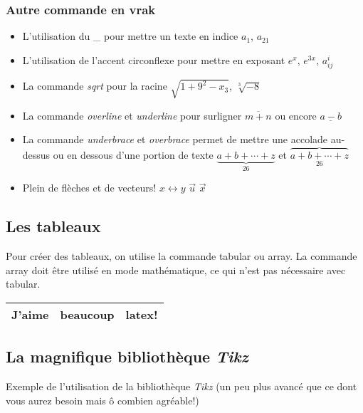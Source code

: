 \documentclass[12pt,twoside,a4paper]{article}
\begin{document}
	
	
	
	
	
	
	\subsubsection{Autre commande en vrak}
	\begin{itemize}
		\item L'utilisation du \_ pour mettre un texte en indice $a_1$, $a_{21}$
		\item L'utilisation de l'accent circonflexe pour mettre en exposant $e^x$, $e^{3x}$, $a^{i}_{ij}$
		\item La commande \textit{sqrt} pour la racine  $\sqrt{1+9^2-x_3}$, $\sqrt[3]{-8}$
		\item La commande \textit{overline} et \textit{underline} pour surligner  $\overline{m+n}$ ou encore $\underline{a-b}$
		\item La commande \textit{underbrace} et \textit{overbrace} permet de mettre une accolade au-dessus ou en dessous d'une portion de texte $\underbrace{ a+b+\cdots+z }_{26}$ et $\overbrace{ a+b+\cdots+z }_{26}$
		\item Plein de flèches et de vecteurs! $x\leftrightarrow y$ $\vec{u}$ $\vec{x}$
		
	\end{itemize}
	
	
	\subsection{Les tableaux}
	
	Pour créer des tableaux, on utilise la commande tabular ou array. La commande array doit être utilisé en mode mathématique, ce qui n'est pas nécessaire avec tabular. 
	
	\begin{center}
		\begin{tabular}{|l|c|l|}
			\hline
			J'aime & beaucoup & latex!\\
			\hline
		\end{tabular}
	\end{center}
	
	\newpage
	\subsection{La magnifique bibliothèque \textit{Tikz}}
	Exemple de l'utilisation de la bibliothèque \textit{Tikz} (un peu plus avancé que ce dont vous aurez besoin mais ô combien agréable!)
	
\end{document}
